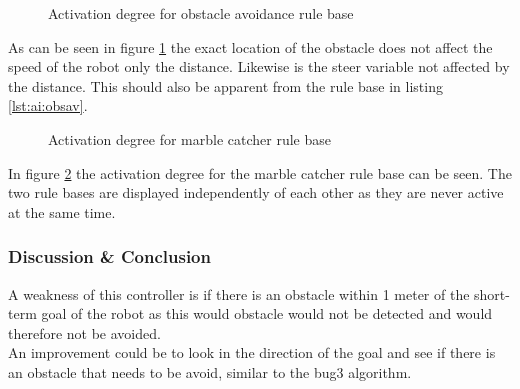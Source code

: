 \documentclass[../../../Main.tex]{subfiles}
\begin{document}
\begin{figure}[h]
  \centering
  \caption{Activation degree for obstacle avoidance rule base}
	\label{fig:fuzzy:activation}
\end{figure}

As can be seen in figure \ref{fig:fuzzy:activation} the exact location of the obstacle does not
affect the speed of the robot only the distance. Likewise is the steer variable not affected by
the distance. This should also be apparent from the rule base in listing \ref{lst:ai:obsav}.


\begin{figure}[H]
  \centering
	\makebox[\textwidth][c]{
		\subfloat{
			
		}
		\subfloat{
			
		}
	}

  \caption{Activation degree for marble catcher rule base}
	\label{fig:fuzzy:activationMarb}
\end{figure}

In figure \ref{fig:fuzzy:activationMarb} the activation degree for  the marble catcher rule base 
can be seen. The two rule bases are displayed independently of each other as they are never active at the same time.

\subsubsection{Discussion \& Conclusion}%
\label{ssub:discusion}


A weakness of this controller is if there is an obstacle within 1 meter of the short-term goal of
the robot as this would obstacle would not be detected and would therefore not be avoided.\\
An improvement could be to look in the direction of the goal and see if there is an obstacle that
needs to be avoid, similar to the bug3 algorithm.
\end{document}
